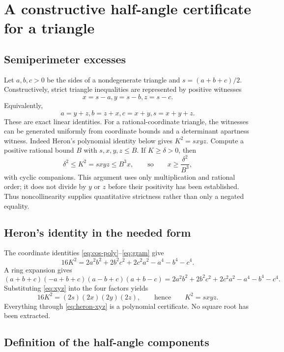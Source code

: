 \documentclass[11pt,letterpaper]{article}
\theoremstyle{definition}
\theoremstyle{remark}
\begin{document}
\section{A constructive half-angle certificate for a triangle}
\label{sec:halfangle}

\subsection{Semiperimeter excesses}

Let \(a,b,c>0\) be the sides of a nondegenerate triangle and
\(s=(a+b+c)/2\).  Constructively, strict triangle inequalities are represented
by positive witnesses
\[
 x=s-a,
 y=s-b,
 z=s-c.
 \tag{3.1}\label{eq:xyz}
\]
Equivalently,
\[
 a=y+z,
 b=z+x,
 c=x+y,
 s=x+y+z.
 \tag{3.2}\label{eq:sides-xyz}
\]
These are exact linear identities.  For a rational-coordinate triangle, the
witnesses can be generated uniformly from coordinate bounds and a determinant
apartness witness.  Indeed Heron's polynomial identity below gives
\(K^2=sxyz\).  Compute a positive rational bound \(B\) with
\(s,x,y,z\le B\).  If \(K\ge\delta>0\), then
\[
 \delta^2\le K^2=sxyz\le B^3x,
 \qquad\text{so}\qquad
 x\ge \frac{\delta^2}{B^3},
\]
with cyclic companions.  This argument uses only multiplication and rational
order; it does not divide by \(y\) or \(z\) before their positivity has
been established.  Thus noncollinearity supplies quantitative strictness
rather than only a negated equality.

\subsection{Heron's identity in the needed form}

The coordinate identities \eqref{eq:cos-poly}--\eqref{eq:gram} give
\[
 16K^2=2a^2b^2+2b^2c^2+2c^2a^2-a^4-b^4-c^4.
 \tag{3.3}\label{eq:heron-symmetric}
\]
A ring expansion gives
\[
 (a+b+c)(-a+b+c)(a-b+c)(a+b-c)
 =2a^2b^2+2b^2c^2+2c^2a^2-a^4-b^4-c^4.
 \tag{3.4}\label{eq:heron-factor}
\]
Substituting \eqref{eq:xyz} into the four factors yields
\[
 16K^2=(2s)(2x)(2y)(2z),
 \qquad\text{hence}\qquad
 K^2=sxyz.
 \tag{3.5}\label{eq:heron-xyz}
\]
Everything through \eqref{eq:heron-xyz} is a polynomial certificate.  No
square root has been extracted.

\subsection{Definition of the half-angle components}
\end{document}
